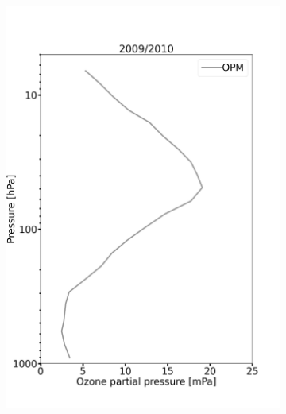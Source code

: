 \documentclass{article}
\begin{document}
    \begin{figure}
        \begin{subfigure}[t]{0.33\textwidth}
            \includegraphics[width=\linewidth]{png/profile_unc__sm_hv_0910_TRRM_SPC1010}
        \end{subfigure}%
    \hspace{-0.54cm}
        \begin{subfigure}[t]{0.33\textwidth}

\end{subfigure}
\end{figure}
\end{document}
